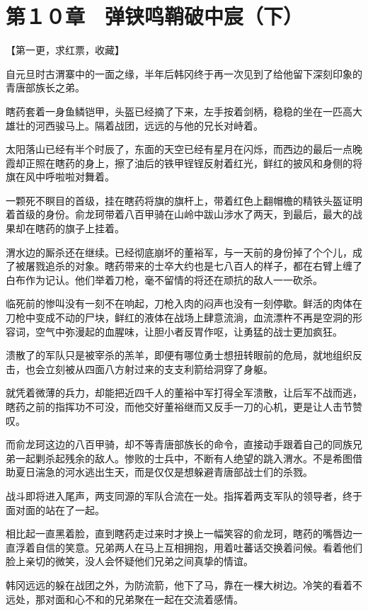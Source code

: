 \section{第１０章　弹铗鸣鞘破中宸（下）}

【第一更，求红票，收藏】

自元旦时古渭寨中的一面之缘，半年后韩冈终于再一次见到了给他留下深刻印象的青唐部族长之弟。

瞎药套着一身鱼鳞铠甲，头盔已经摘了下来，左手按着剑柄，稳稳的坐在一匹高大雄壮的河西骏马上。隔着战团，远远的与他的兄长对峙着。

太阳落山已经有半个时辰了，东面的天空已经有星月在闪烁，而西边的最后一点晚霞却正照在瞎药的身上，擦了油后的铁甲锃锃反射着红光，鲜红的披风和身侧的将旗在风中呼啦啦对舞着。

一颗死不瞑目的首级，挂在瞎药将旗的旗杆上，带着红色上翻帽檐的精铁头盔证明着首级的身份。俞龙珂带着八百甲骑在山岭中跋山涉水了两天，到最后，最大的战果却在瞎药的旗子上挂着。

渭水边的厮杀还在继续。已经彻底崩坏的董裕军，与一天前的身份掉了个个儿，成了被屠戮追杀的对象。瞎药带来的士卒大约也是七八百人的样子，都在右臂上缠了白布作为记认。他们举着刀枪，毫不留情的将还在顽抗的敌人一一砍杀。

临死前的惨叫没有一刻不在响起，刀枪入肉的闷声也没有一刻停歇。鲜活的肉体在刀枪中变成不动的尸块，鲜红的液体在战场上肆意流淌，血流漂杵不再是空洞的形容词，空气中弥漫起的血腥味，让胆小者反胃作呕，让勇猛的战士更加疯狂。

溃散了的军队只是被宰杀的羔羊，即便有哪位勇士想扭转眼前的危局，就地组织反击，也会立刻被从四面八方射过来的支支利箭给洞穿了身躯。

就凭着微薄的兵力，却能把近四千人的董裕中军打得全军溃散，让后军不战而逃，瞎药之前的指挥功不可没，而他交好董裕继而又反手一刀的心机，更是让人击节赞叹。

而俞龙珂这边的八百甲骑，却不等青唐部族长的命令，直接动手跟着自己的同族兄弟一起剿杀起残余的敌人。惨败的士兵中，不断有人绝望的跳入渭水。不是希图借助夏日湍急的河水逃出生天，而是仅仅是想躲避青唐部战士们的杀戮。

战斗即将进入尾声，两支同源的军队合流在一处。指挥着两支军队的领导者，终于面对面的站在了一起。

相比起一直黑着脸，直到瞎药走过来时才换上一幅笑容的俞龙珂，瞎药的嘴唇边一直浮着自信的笑意。兄弟两人在马上互相拥抱，用着吐蕃话交换着问候。看着他们脸上亲切的微笑，没人会怀疑他们兄弟之间真挚的情谊。

韩冈远远的躲在战团之外，为防流箭，他下了马，靠在一棵大树边。冷笑的看着不远处，那对面和心不和的兄弟聚在一起在交流着感情。

